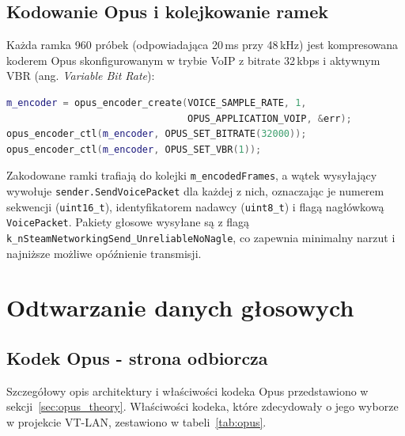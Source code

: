 \subsection*{Kodowanie Opus i kolejkowanie ramek}

Każda ramka 960 próbek (odpowiadająca 20\,ms przy 48\,kHz) jest
kompresowana koderem Opus skonfigurowanym w trybie VoIP z bitrate 32\,kbps
i aktywnym VBR (ang. \textit{Variable Bit Rate}):

\begin{lstlisting}[language=C++, caption={Inicjalizacja kodera Opus (praca własna)}, label={lst:opusinit}]
m_encoder = opus_encoder_create(VOICE_SAMPLE_RATE, 1,
                                OPUS_APPLICATION_VOIP, &err);
opus_encoder_ctl(m_encoder, OPUS_SET_BITRATE(32000));
opus_encoder_ctl(m_encoder, OPUS_SET_VBR(1));
\end{lstlisting}

Zakodowane ramki trafiają do kolejki \texttt{m\_encodedFrames},
a wątek wysyłający wywołuje \texttt{sender.SendVoicePacket} dla każdej
z nich, oznaczając je numerem sekwencji (\texttt{uint16\_t}),
identyfikatorem nadawcy (\texttt{uint8\_t}) i flagą nagłówkową
\texttt{VoicePacket}. Pakiety głosowe wysyłane są z flagą
\texttt{k\_nSteamNetworkingSend\_UnreliableNoNagle}, co zapewnia
minimalny narzut i najniższe możliwe opóźnienie transmisji.


\section{Odtwarzanie danych głosowych}
\label{sec:voicerecv}

\subsection*{Kodek Opus - strona odbiorcza}

Szczegółowy opis architektury i właściwości kodeka Opus przedstawiono
w sekcji~\ref{sec:opus_theory}. Właściwości kodeka, które zdecydowały
o jego wyborze w projekcie VT-LAN, zestawiono w tabeli~\ref{tab:opus}.

